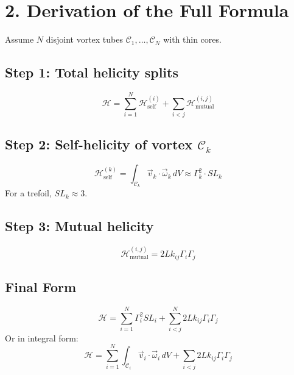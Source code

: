 \documentclass[11pt]{article}
\begin{document}
    \section*{2. Derivation of the Full Formula}
    Assume $N$ disjoint vortex tubes $\mathcal{C}_1, \dots, \mathcal{C}_N$ with thin cores.

    \subsection*{Step 1: Total helicity splits}
    \begin{equation}
        \mathcal{H} = \sum_{i=1}^N \mathcal{H}_{\text{self}}^{(i)} + \sum_{i < j} \mathcal{H}_{\text{mutual}}^{(i,j)}
    \end{equation}

    \subsection*{Step 2: Self-helicity of vortex $\mathcal{C}_k$}
    \begin{equation}
        \mathcal{H}_{\text{self}}^{(k)} = \int_{\mathcal{C}_k} \vec{v}_k \cdot \vec{\omega}_k \, dV \approx \Gamma_k^2 \cdot SL_k
    \end{equation}
    For a trefoil, $SL_k \approx 3$.

    \subsection*{Step 3: Mutual helicity}
    \begin{equation}
        \mathcal{H}_{\text{mutual}}^{(i,j)} = 2 Lk_{ij} \Gamma_i \Gamma_j
    \end{equation}

    \subsection*{Final Form}
    \begin{equation}
        \boxed{
            \mathcal{H} = \sum_{i=1}^{N} \Gamma_i^2 SL_i + \sum_{i < j}^{N} 2 Lk_{ij} \Gamma_i \Gamma_j
        }
    \end{equation}
    Or in integral form:
    \begin{equation}
        \boxed{
            \mathcal{H} = \sum_{i=1}^{N} \int_{\mathcal{C}_i} \vec{v}_i \cdot \vec{\omega}_i \, dV + \sum_{i < j} 2 Lk_{ij} \Gamma_i \Gamma_j
        }
    \end{equation}
\end{document}

